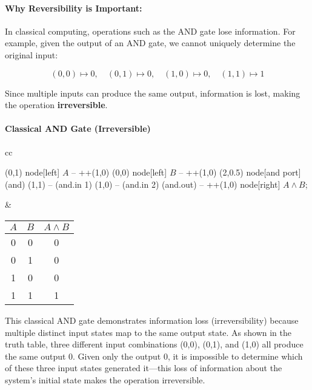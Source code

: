 \paragraph{Why Reversibility is Important:}
In classical computing, operations such as the AND gate lose information.
For example, given the output of an AND gate, we cannot uniquely determine
the original input:

\[
  (0,0) \mapsto 0, \quad (0,1) \mapsto 0, \quad (1,0) \mapsto 0, \quad
  (1,1) \mapsto 1
\]

Since multiple inputs can produce the same output, information is lost,
making the operation \textbf{irreversible}.

\paragraph{Classical AND Gate (Irreversible)}
\begin{center}
  \begin{tabular}{cc}
    \begin{circuitikz} \draw
      (0,1) node[left] {$A$} -- ++(1,0)
      (0,0) node[left] {$B$} -- ++(1,0)
      (2,0.5) node[and port] (and) {}
      (1,1) -- (and.in 1)
      (1,0) -- (and.in 2)
      (and.out) -- ++(1,0) node[right] {$A \land B$};
    \end{circuitikz}
    &
    \begin{tabular}{|c|c|c|}
      \hline
      $A$ & $B$ & $A \land B$ \\
      \hline
      0 & 0 & 0 \\
      0 & 1 & 0 \\
      1 & 0 & 0 \\
      1 & 1 & 1 \\
      \hline
    \end{tabular}
  \end{tabular}
\end{center}

\noindent This classical AND gate demonstrates information loss
(irreversibility) because multiple distinct input states map to the same
output state. As shown in the truth table, three different input
combinations (0,0), (0,1), and (1,0) all produce the same output 0. Given
only the output 0, it is impossible to determine which of these three input
states generated it—this loss of information about the system's initial
state makes the operation irreversible.

